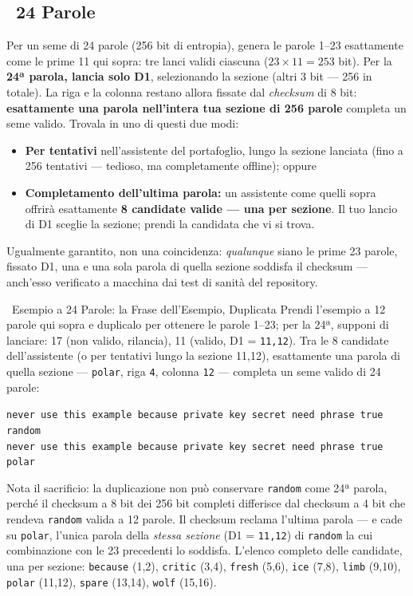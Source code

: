 \documentclass[10pt]{article}
\begin{document}
\subsection*{\faLayerGroup~24 Parole}

Per un seme di 24 parole (256 bit di entropia), genera le parole 1--23 esattamente come le prime 11 qui sopra: tre lanci validi ciascuna ($23\times11=253$ bit). Per la \textbf{24ª parola, lancia solo D1}, selezionando la sezione (altri 3 bit --- 256 in totale). La riga e la colonna restano allora fissate dal \textit{checksum} di 8 bit: \textbf{esattamente una parola nell'intera tua sezione di 256 parole} completa un seme valido. Trovala in uno di questi due modi:

\begin{itemize}[itemsep=1pt]
 \item \textbf{Per tentativi} nell'assistente del portafoglio, lungo la sezione lanciata (fino a 256 tentativi --- tedioso, ma completamente offline); oppure
 \item \textbf{Completamento dell'ultima parola:} un assistente come quelli sopra offrirà esattamente \textbf{8 candidate valide --- una per sezione}. Il tuo lancio di D1 sceglie la sezione; prendi la candidata che vi si trova.
\end{itemize}

Ugualmente garantito, non una coincidenza: \emph{qualunque} siano le prime 23 parole, fissato D1, una e una sola parola di quella sezione soddisfa il checksum --- anch'esso verificato a macchina dai test di sanità del repository.

\begin{examplebox}{\faLightbulb~Esempio a 24 Parole: la Frase dell'Esempio, Duplicata}
Prendi l'esempio a 12 parole qui sopra e duplicalo per ottenere le parole 1--23; per la 24ª, supponi di lanciare: 17 (non valido, rilancia), 11 (valido, D1 = \texttt{11,12}). Tra le 8 candidate dell'assistente (o per tentativi lungo la sezione 11,12), esattamente una parola di quella sezione --- \texttt{polar}, riga \texttt{4}, colonna \texttt{12} --- completa un seme valido di 24 parole:

\vspace{0.5em}
\texttt{never use this example because private key secret need phrase true random}\\
\texttt{never use this example because private key secret need phrase true polar}~\faCheckCircle
\vspace{0.5em}

Nota il sacrificio: la duplicazione non può conservare \texttt{random} come 24ª parola, perché il checksum a 8 bit dei 256 bit completi differisce dal checksum a 4 bit che rendeva \texttt{random} valida a 12 parole. Il checksum reclama l'ultima parola --- e cade su \texttt{polar}, l'unica parola della \emph{stessa sezione} (D1 = \texttt{11,12}) di \texttt{random} la cui combinazione con le 23 precedenti lo soddisfa. L'elenco completo delle candidate, una per sezione: \texttt{because} (1,2), \texttt{critic} (3,4), \texttt{fresh} (5,6), \texttt{ice} (7,8), \texttt{limb} (9,10), \texttt{polar} (11,12), \texttt{spare} (13,14), \texttt{wolf} (15,16).
\end{examplebox}
\end{document}
